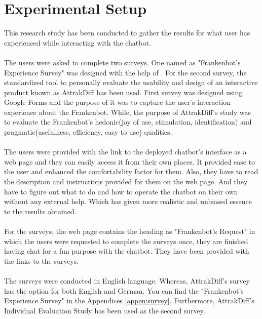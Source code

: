 \section{Experimental Setup}
This research study has been conducted to gather the results for what user has experienced while interacting with the chatbot. 
\\~\\
The users were asked to complete two surveys. One named as "Frankenbot's Experience Survey" was designed with the help of \cite{MOLLER200726}\cite{itut}. For the second survey, the standardized tool to personally evaluate the usability and design of an interactive product known as AttrakDiff\cite{attrakdiff} has been used. First survey was designed using Google Forms and the purpose of it was to capture the user's interaction experience about the Frankenbot. While, the purpose of AttrakDiff's study was to evaluate the Frankenbot's hedonic(joy of use, stimulation, identification) and pragmatic(usefulness, efficiency, easy to use) qualities. 
\\~\\
The users were provided with the link to the deployed chatbot's interface as a web page and they can easily access it from their own places. It provided ease to the user and enhanced the comfortability factor for them. Also, they have to read the description and instructions provided for them on the web page. And they have to figure out what to do and how to operate the chatbot on their own without any external help. Which has given more realistic and unbiased essence to the results obtained.
\\~\\
For the surveys, the web page contains the heading as "Frankenbot's Request" in which the users were requested to complete the surveys once, they are finished having chat for a fun purpose with the chatbot. They have been provided with the links to the surveys.
\\~\\
The surveys were conducted in English language. Whereas, AttrakDiff's survey has the option for both English and German. You can find the "Frankenbot's Experience Survey" in the Appendices \ref{appen:survey}. Furthermore, AttrakDiff's Individual Evaluation Study\cite{indeval} has been used as the second survey.
